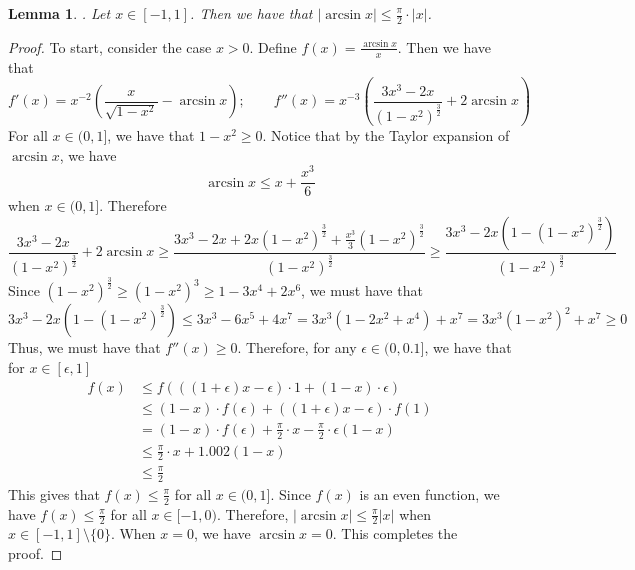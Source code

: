 \documentclass[10pt]{article} %
\newtheorem{lemma}[theorem]{Lemma}
\theoremstyle{definition}
\theoremstyle{plain}
\newcommand{\paren}[1]{\left(#1\right)}
\begin{document}
\begin{lemma}
    \label{lem:arcsin_bound}.
    Let $x\in[-1,1]$. Then we have that $|\arcsin x|\leq \frac{\pi}{2}\cdot |x|$.
\end{lemma}
\begin{proof}
    To start, consider the case $x > 0$. Define $f(x) = \frac{\arcsin x}{x}$. Then we have that
    \[
        f'(x) = x^{-2}\paren{\frac{x}{\sqrt{1-x^2}} - \arcsin x};\quad\quad f''(x) = x^{-3}\paren{\frac{3x^3-2x}{\paren{1-x^2}^{\frac{3}{2}}} + 2 \arcsin x}
    \]
    For all $x\in (0, 1]$, we have that $1 - x^2 \geq 0$. Notice that by the Taylor expansion of $\arcsin x$, we have
    \[
        \arcsin x \leq x + \frac{x^3}{6}
    \]
    when $x\in(0, 1]$. Therefore
    \[
        \frac{3x^3-2x}{\paren{1-x^2}^{\frac{3}{2}}} + 2 \arcsin x \geq \frac{3x^3-2x + 2x\paren{1-x^2}^{\frac{3}{2}} + \frac{x^3}{3}\paren{1-x^2}^{\frac{3}{2}}}{\paren{1-x^2}^{\frac{3}{2}}} \geq \frac{3x^3 - 2x\paren{1 - \paren{1-x^2}^{\frac{3}{2}}}}{\paren{1-x^2}^{\frac{3}{2}}}
    \]
    Since $\paren{1-x^2}^{\frac{3}{2}} \geq \paren{1-x^2}^3 \geq 1- 3x^4 + 2x^6$, we must have that
    \[
        3x^3 - 2x\paren{1 - \paren{1-x^2}^{\frac{3}{2}}} \leq 3x^3 - 6x^5 + 4x^7 = 3x^3\paren{1 - 2x^2 + x^4} + x^7 = 3x^3\paren{1-x^2}^2 + x^7 \geq 0
    \]
    Thus, we must have that $f''(x) \geq 0$. Therefore, for any $\epsilon \in (0, 0.1]$, we have that for $x\in[\epsilon, 1]$
    \begin{align*}
        f\paren{x} & \leq f\paren{\paren{(1+\epsilon)x - \epsilon}\cdot 1 + (1-x)\cdot \epsilon}\\
        & \leq (1-x)\cdot f(\epsilon) + \paren{(1+\epsilon)x - \epsilon}\cdot f(1)\\
        & = (1-x)\cdot f\paren{\epsilon} + \frac{\pi}{2}\cdot x - \frac{\pi}{2}\cdot \epsilon\paren{1-x}\\
        & \leq \frac{\pi}{2}\cdot x + 1.002\paren{1-x}\\
        & \leq \frac{\pi}{2}
    \end{align*}
    This gives that $f\paren{x}\leq \frac{\pi}{2}$ for all $x\in(0,1]$. Since $f\paren{x}$ is an even function, we have $f\paren{x}\leq \frac{\pi}{2}$ for all $x\in[-1, 0)$. Therefore, $|\arcsin x|\leq \frac{\pi}{2}|x|$ when $x\in[-1,1]\setminus\{0\}$. When $x = 0$, we have $\arcsin x = 0$. This completes the proof. 
\end{proof}
\end{document}
